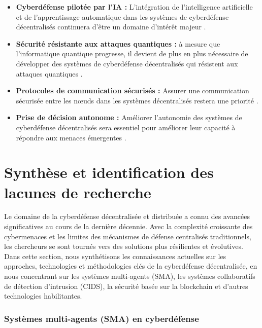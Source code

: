 \begin{itemize}
    \item \textbf{Cyberdéfense pilotée par l'IA :} L'intégration de l'intelligence artificielle et de l'apprentissage automatique dans les systèmes de cyberdéfense décentralisés continuera d'être un domaine d'intérêt majeur \cite{Kaur2023}.

    \item \textbf{Sécurité résistante aux attaques quantiques :} à mesure que l'informatique quantique progresse, il devient de plus en plus nécessaire de développer des systèmes de cyberdéfense décentralisés qui résistent aux attaques quantiques \cite{Bernstein2017}.

    \item \textbf{Protocoles de communication sécurisés :} Assurer une communication sécurisée entre les nœuds dans les systèmes décentralisés restera une priorité \cite{Granjal2015}.

    \item \textbf{Prise de décision autonome :} Améliorer l'autonomie des systèmes de cyberdéfense décentralisés sera essentiel pour améliorer leur capacité à répondre aux menaces émergentes \cite{Nguyen2019}.
\end{itemize}



\section{Synthèse et identification des lacunes de recherche}

Le domaine de la cyberdéfense décentralisée et distribuée a connu des avancées significatives au cours de la dernière décennie. Avec la complexité croissante des cybermenaces et les limites des mécanismes de défense centralisés traditionnels, les chercheurs se sont tournés vers des solutions plus résilientes et évolutives. Dans cette section, nous synthétisons les connaissances actuelles sur les approches, technologies et méthodologies clés de la cyberdéfense décentralisée, en nous concentrant sur les systèmes multi-agents (SMA), les systèmes collaboratifs de détection d'intrusion (CIDS), la sécurité basée sur la blockchain et d'autres technologies habilitantes.

\subsubsection{Systèmes multi-agents (SMA) en cyberdéfense}

